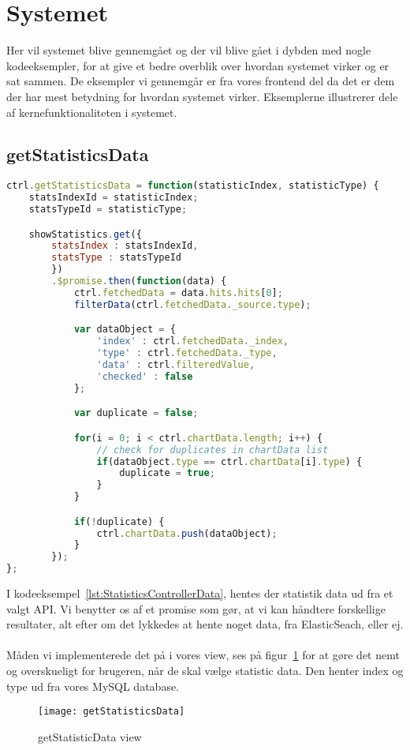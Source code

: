 \section{Systemet}
Her vil systemet blive gennemgået og der vil blive gået i dybden med nogle kodeeksempler, for at give et bedre overblik over hvordan systemet virker og er sat sammen.
De eksempler vi gennemgår er fra vores frontend del da det er dem der har mest betydning for hvordan systemet virker.
Eksemplerne illustrerer dele af kernefunktionaliteten i systemet.
\subsection{getStatisticsData}
\begin{lstlisting}[caption={getStatisticsData}, language={JavaScript}, label={lst:StatisticsControllerData}]
ctrl.getStatisticsData = function(statisticIndex, statisticType) {
    statsIndexId = statisticIndex;
    statsTypeId = statisticType;

    showStatistics.get({
        statsIndex : statsIndexId,
        statsType : statsTypeId
        })
        .$promise.then(function(data) {
            ctrl.fetchedData = data.hits.hits[0];
            filterData(ctrl.fetchedData._source.type);

            var dataObject = {
                'index' : ctrl.fetchedData._index,
                'type' : ctrl.fetchedData._type,
                'data' : ctrl.filteredValue,
                'checked' : false
            };

            var duplicate = false;

            for(i = 0; i < ctrl.chartData.length; i++) {
                // check for duplicates in chartData list
                if(dataObject.type == ctrl.chartData[i].type) {
                    duplicate = true;
                }
            }

            if(!duplicate) {
                ctrl.chartData.push(dataObject);
            }
        });
};
\end{lstlisting}
I kodeeksempel~\ref{lst:StatisticsControllerData}, hentes der statistik data ud fra et valgt API.
Vi benytter os af et promise som gør, at vi kan håndtere forskellige resultater, alt efter om det lykkedes at hente noget data, fra ElasticSeach, eller ej.
\\\\
Måden vi implementerede det på i vores view, ses på figur~\ref{fig:getStatisticsData} for at gøre det nemt og overskueligt for brugeren,
når de skal vælge statistic data.
Den henter index og type ud fra vores MySQL database.
\begin{figure}[H]
\texttt{[image: getStatisticsData]}
\caption{getStatisticData view}
\label{fig:getStatisticsData}
\end{figure}
